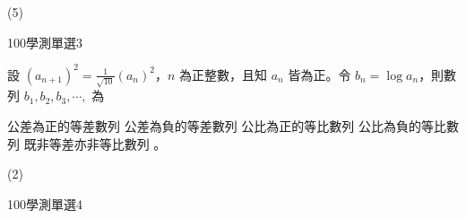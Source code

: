 \begin{QUESTIONS}
\begin{QUESTION}
        \begin{QTAGS}\end{QTAGS}
        \begin{QANS}
            (5)
        \end{QANS}
        \begin{QSOLLIST}
        \end{QSOLLIST}
        \begin{QEMPTYSPACE}
        \end{QEMPTYSPACE}
    \end{QUESTION}
    \begin{QUESTION}
        \begin{ExamInfo}{100}{學測}{單選}{3}
        \end{ExamInfo}
        \begin{ExamAnsRateInfo}{28}{56}{14}{14}
        \end{ExamAnsRateInfo}
        \begin{QBODY}
			設 $(a_{n+1})^2=\frac{1}{\sqrt{10}}(a_n)^2$，$n$ 為正整數，且知 $a_n $ 皆為正。令 $b_n=\log a_n$，則數列 $b_1, b_2,b_3,\cdots,$ 為 
			\begin{QOPS} 
				\QOP 公差為正的等差數列 
				\QOP 公差為負的等差數列 
				\QOP 公比為正的等比數列 
				\QOP 公比為負的等比數列 
				\QOP 既非等差亦非等比數列 。
			\end{QOPS}
        \end{QBODY}
        \begin{QFROMS}
        \end{QFROMS}
        \begin{QTAGS}\end{QTAGS}
        \begin{QANS}
            (2)
        \end{QANS}
        \begin{QSOLLIST}
        \end{QSOLLIST}
        \begin{QEMPTYSPACE}
        \end{QEMPTYSPACE}
    \end{QUESTION}
    \begin{QUESTION}
        \begin{ExamInfo}{100}{學測}{單選}{4}
        \end{ExamInfo}
        \begin{ExamAnsRateInfo}{30}{51}{20}{19}
        \end{ExamAnsRateInfo}
        \begin{QBODY}

\end{QBODY}
\end{QUESTION}
\end{QUESTIONS}
